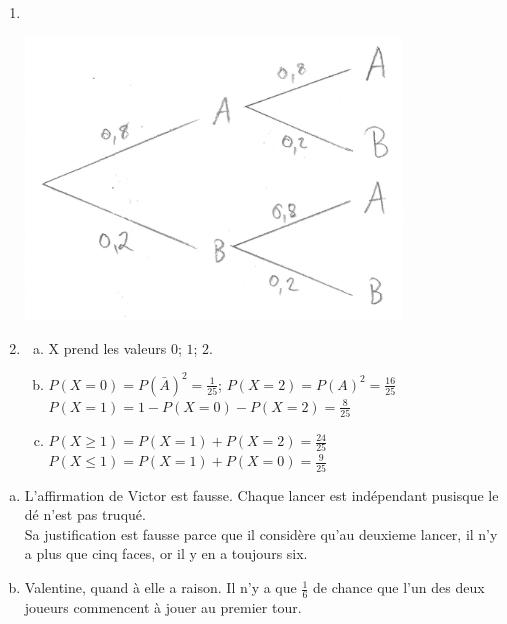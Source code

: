 \documentclass[12pt, a4paper]{article}
\begin{document}
    \begin{Exercise}[number={66}]
      \begin{enumerate}[1.]
        \item \ \\\parbox{\linewidth}{
                    \centering
                    \includegraphics[width=10cm]{VAimg1.jpg}
                  } \bigbreak
        \item \begin{enumerate}[a)]
                \item X prend les valeurs $0$; $1$; $2$.
                \item $P(X=0)=P(\bar{A})^2=\frac{1}{25}$; \quad $P(X=2)=P(A)^2=\frac{16}{25}$ \smallbreak $P(X=1)=1-P(X=0)-P(X=2)=\frac{8}{25}$
                \item $P(X\geq1)=P(X=1)+P(X=2)=\frac{24}{25}$ \smallbreak $P(X\leq1)=P(X=1)+P(X=0)=\frac{9}{25}$
              \end{enumerate}
      \end{enumerate}
    \end{Exercise}

    \begin{Exercise}[number={67}]
      \begin{enumerate}[a)]
        \item L'affirmation de Victor est fausse. Chaque lancer est indépendant pusisque le dé n'est pas truqué. \\ Sa justification est fausse parce que il considère qu'au deuxieme lancer, il n'y a plus que cinq faces, or il y en a toujours six.
        \item Valentine, quand à elle a raison. Il n'y a que $\frac{1}{6}$ de chance que l'un des deux joueurs commencent à jouer au premier tour.
      \end{enumerate}
    \end{Exercise}
\end{document}
